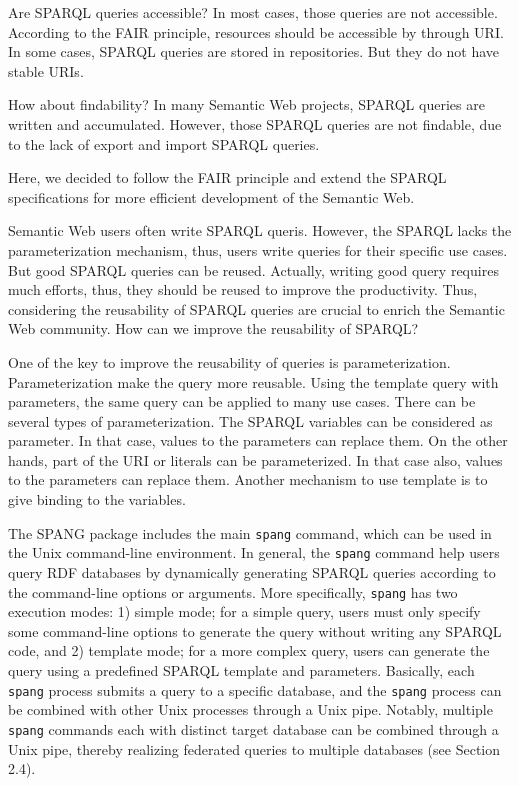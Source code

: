 \documentclass[runningheads]{llncs}
\begin{document}
Are SPARQL queries accessible? In most cases, those queries are not accessible. According to the FAIR principle, resources should be accessible by through URI. In some cases, SPARQL queries are stored in repositories. But they do not have stable URIs.

How about findability? In many Semantic Web projects, SPARQL queries are written and accumulated. However, those SPARQL queries are not findable, due to the lack of export and import SPARQL queries.

Here, we decided to follow the FAIR principle and extend the SPARQL specifications for more efficient development of the Semantic Web.

Semantic Web users often write SPARQL queris.
However, the SPARQL lacks the parameterization mechanism, thus, users write queries for their specific use cases.
But good SPARQL queries can be reused.
Actually, writing good query requires much efforts, thus, they should be reused to improve the productivity.
Thus, considering the reusability of SPARQL queries are crucial to enrich the Semantic Web community.
How can we improve the reusability of SPARQL?

One of the key to improve the reusability of queries is parameterization.
Parameterization make the query more reusable.
Using the template query with parameters, the same query can be applied to many use cases.
There can be several types of parameterization.
The SPARQL variables can be considered as parameter.
In that case, values to the parameters can replace them.
On the other hands, part of the URI or literals can be parameterized.
In that case also, values to the parameters can replace them.
Another mechanism to use template is to give binding to the variables.

The SPANG package includes the main {\tt spang} command, which can be used in the Unix command-line environment.
In general, the {\tt spang} command help users query RDF databases by dynamically generating SPARQL queries according to the command-line options or arguments. 
More specifically, {\tt spang} has two execution modes: 
1) simple mode; for a simple query, users must only specify some command-line options to generate the query without writing any SPARQL code, and
2) template mode; for a more complex query, users can generate the query using a predefined SPARQL template and parameters.
Basically, each {\tt spang} process submits a query to a specific database,
and the {\tt spang} process can be combined with other Unix processes through a Unix pipe. 
Notably, multiple {\tt spang} commands each with distinct target database can be combined through a Unix pipe, thereby realizing federated queries to multiple databases (see Section 2.4). 
\end{document}

